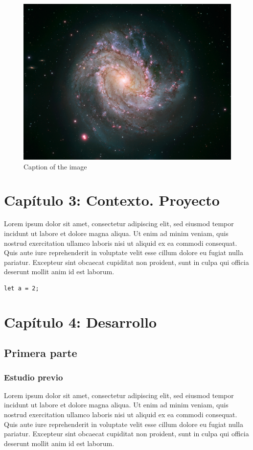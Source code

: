 \begin{figure}[H]
\centering
\includegraphics[width=5.64in]{figures/heic1403b.jpg}
\caption{Caption of the image}
\end{figure}
\chapter{Cap\'itulo 3: Contexto. Proyecto}
Lorem ipsum dolor sit amet, consectetur adipiscing elit, sed eiusmod tempor incidunt ut labore et dolore magna aliqua. Ut enim ad minim veniam, quis nostrud exercitation ullamco laboris nisi ut aliquid ex ea commodi consequat. Quis aute iure reprehenderit in voluptate velit esse cillum dolore eu fugiat nulla pariatur. Excepteur sint obcaecat cupiditat non proident, sunt in culpa qui officia deserunt mollit anim id est laborum.

\begin{lstlisting} 
let a = 2;
\end{lstlisting}
 
\chapter{Cap\'itulo 4: Desarrollo}
\section{Primera parte}
\subsection{Estudio previo}
Lorem ipsum dolor sit amet, consectetur adipiscing elit, sed eiusmod tempor incidunt ut labore et dolore magna aliqua. Ut enim ad minim veniam, quis nostrud exercitation ullamco laboris nisi ut aliquid ex ea commodi consequat. Quis aute iure reprehenderit in voluptate velit esse cillum dolore eu fugiat nulla pariatur. Excepteur sint obcaecat cupiditat non proident, sunt in culpa qui officia deserunt mollit anim id est laborum.
 
